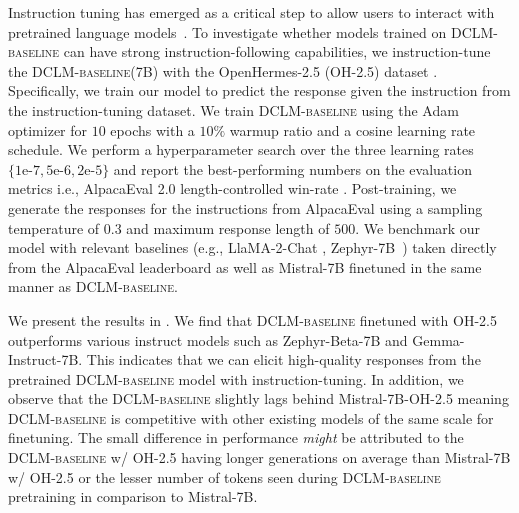 \documentclass{article}
\newcommand{\hqpool}{\textsc{DCLM-baseline}\xspace}
\newcommand{\oh}{\textsc{OH-2.5}\xspace}
\begin{document}
Instruction tuning has emerged as a critical step to allow users to interact with pretrained language models~\citep{wei2021finetuned, wang2022super, muennighoff2022crosslingual,muennighoff2024generative,yin2023dynosaur}. To investigate whether models trained on \hqpool can have strong instruction-following capabilities, we instruction-tune the \hqpool (7B) with the OpenHermes-2.5 (\oh) dataset \citep{openhermes}. Specifically, we train our model to predict the response given the instruction from the instruction-tuning dataset. We train \hqpool using the Adam \citep{kingma2014adam} optimizer for $10$ epochs with a $10\%$ warmup ratio and a cosine learning rate schedule. We perform a hyperparameter search over the three learning rates $\{1\text{e-}7, 5\text{e-}6, 2\text{e-}5\}$  and report the best-performing numbers on the evaluation metrics i.e., AlpacaEval 2.0 length-controlled win-rate \citep{dubois2024length}. Post-training, we generate the responses for the instructions from AlpacaEval using a sampling temperature of $0.3$ and maximum response length of $500$. We benchmark our model with relevant baselines (e.g., LlaMA-2-Chat \citep{llama2}, Zephyr-7B~\citep{tunstall2023zephyr}) taken directly from the AlpacaEval leaderboard as well as Mistral-7B \citep{jiang2023mistral} finetuned in the same manner as \hqpool.



We present the results in . We find that \hqpool finetuned with \oh outperforms various instruct models such as Zephyr-Beta-7B and Gemma-Instruct-7B. This indicates that we can elicit high-quality responses from the pretrained \hqpool model with instruction-tuning. In addition, we observe that the \hqpool slightly lags behind Mistral-7B-\oh meaning \hqpool is competitive with other existing models of the same scale for finetuning. The small difference in performance \textit{might} be attributed to the \hqpool w/ \oh having longer generations on average than Mistral-7B w/ \oh or the lesser number of tokens seen during \hqpool pretraining in comparison to Mistral-7B.
\end{document}
